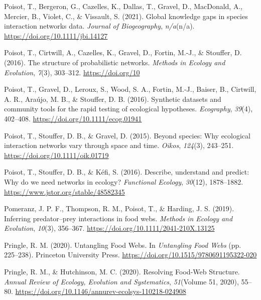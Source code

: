 \documentclass[
]{article}
\newlength{\cslhangindent}
\newenvironment{CSLReferences}[2] %
 {\begin{list}{}{%
  \setlength{\itemindent}{0pt}
  \setlength{\leftmargin}{0pt}
  \setlength{\parsep}{0pt}
  \ifodd #1
   \setlength{\leftmargin}{\cslhangindent}
   \setlength{\itemindent}{-1\cslhangindent}
  \fi
  \setlength{\itemsep}{#2\baselineskip}}}
 {\end{list}}
\begin{document}
\begin{CSLReferences}{1}{0}
Poisot, T., Bergeron, G., Cazelles, K., Dallas, T., Gravel, D.,
MacDonald, A., Mercier, B., Violet, C., \& Vissault, S. (2021). Global
knowledge gaps in species interaction networks data. \emph{Journal of
Biogeography}, \emph{n/a}(n/a). \url{https://doi.org/10.1111/jbi.14127}

Poisot, T., Cirtwill, A., Cazelles, K., Gravel, D., Fortin, M.-J., \&
Stouffer, D. (2016). The structure of probabilistic networks.
\emph{Methods in Ecology and Evolution}, \emph{7}(3), 303--312.
\url{https://doi.org/10}

Poisot, T., Gravel, D., Leroux, S., Wood, S. A., Fortin, M.-J., Baiser,
B., Cirtwill, A. R., Araújo, M. B., \& Stouffer, D. B. (2016). Synthetic
datasets and community tools for the rapid testing of ecological
hypotheses. \emph{Ecography}, \emph{39}(4), 402--408.
\url{https://doi.org/10.1111/ecog.01941}

Poisot, T., Stouffer, D. B., \& Gravel, D. (2015). Beyond species: Why
ecological interaction networks vary through space and time.
\emph{Oikos}, \emph{124}(3), 243--251.
\url{https://doi.org/10.1111/oik.01719}

Poisot, T., Stouffer, D. B., \& Kéfi, S. (2016). Describe, understand
and predict: Why do we need networks in ecology? \emph{Functional
Ecology}, \emph{30}(12), 1878--1882.
\url{https://www.jstor.org/stable/48582345}

Pomeranz, J. P. F., Thompson, R. M., Poisot, T., \& Harding, J. S.
(2019). Inferring predator--prey interactions in food webs.
\emph{Methods in Ecology and Evolution}, \emph{10}(3), 356--367.
\url{https://doi.org/10.1111/2041-210X.13125}

Pringle, R. M. (2020). Untangling {Food Webs}. In \emph{Untangling {Food
Webs}} (pp. 225--238). Princeton University Press.
\url{https://doi.org/10.1515/9780691195322-020}

Pringle, R. M., \& Hutchinson, M. C. (2020). Resolving {Food-Web
Structure}. \emph{Annual Review of Ecology, Evolution and Systematics},
\emph{51}(Volume 51, 2020), 55--80.
\url{https://doi.org/10.1146/annurev-ecolsys-110218-024908}


\end{CSLReferences}
\end{document}
